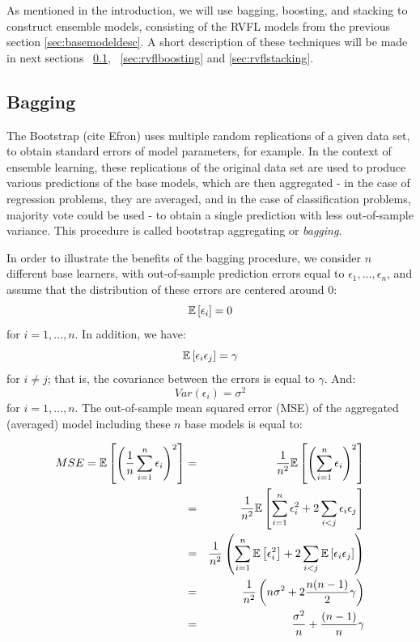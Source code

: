 As mentioned in the introduction, we will use bagging, boosting, and stacking to construct ensemble models, consisting of the RVFL models from the previous section \ref{sec:basemodeldesc}. A short description of these techniques will be made in next sections ~\ref{sec:rvflbagging}, ~\ref{sec:rvflboosting}  and \ref{sec:rvflstacking}.

\subsection{Bagging}
\label{sec:rvflbagging}

The Bootstrap (cite Efron) uses multiple random replications of a given data set, to obtain standard errors of model parameters, for example. In the context of ensemble learning, these replications of the original data set are used to produce various predictions of the base models, which are then aggregated - in the case of regression problems, they are averaged, and in the case of classification problems, majority vote could be used - to obtain a single prediction with less out-of-sample variance. This procedure is called bootstrap aggregating or \textit{bagging}.

\medskip

In order to illustrate the benefits of the bagging procedure, we consider $n$ different base learners, with out-of-sample prediction errors equal to $\epsilon_1, \ldots, \epsilon_n$, and assume that the distribution of these errors are centered around $0$:
$$
\mathbb{E} \left[ \epsilon_i\right] = 0
$$
for $i = 1, \ldots, n$. In addition, we have:
$$
\mathbb{E} \left[ \epsilon_i \epsilon_j\right] = \gamma
$$
for $i \neq j$; that is, the covariance between the errors is equal to $\gamma$. And:
$$
Var(\epsilon_i) = \sigma^2
$$
for $i = 1, \ldots, n$. The out-of-sample mean squared error (MSE) of the aggregated (averaged) model including these $n$ base models is equal to:

\begin{eqnarray*}
MSE = \mathbb{E}\left[ \left( \frac{1}{n} \sum_{i = 1}^n \epsilon_i \right)^2 \right] &=& \frac{1}{n^2} \mathbb{E}\left[ \left( \sum_{i = 1}^n \epsilon_i \right)^2 \right]\\
 &=& \frac{1}{n^2} \mathbb{E}\left[ \sum_{i = 1}^n \epsilon_i^2 + 2 \sum_{i < j} \epsilon_i \epsilon_j  \right]\\
 &=& \frac{1}{n^2} \left( \sum_{i = 1}^n \mathbb{E}\left[\epsilon_i^2\right] + 2 \sum_{i < j} \mathbb{E}\left[\epsilon_i \epsilon_j  \right] \right)\\
 &=& \frac{1}{n^2} \left( n \sigma^2 + 2 \frac{n(n-1)}{2} \gamma \right)\\
 &=& \frac{\sigma^2}{n} + \frac{(n-1)}{n} \gamma \\
\end{eqnarray*}

